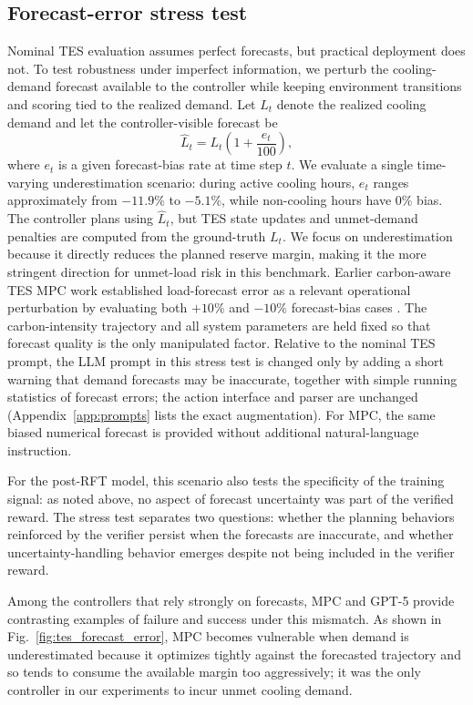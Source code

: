 \documentclass[11pt]{article}
\begin{document}
\subsection{Forecast-error stress test}\label{subsec:robustness}
Nominal TES evaluation assumes perfect forecasts, but practical deployment does not. To test robustness under imperfect information, we perturb the cooling-demand forecast available to the controller while keeping environment transitions and scoring tied to the realized demand. Let $L_t$ denote the realized cooling demand and let the controller-visible forecast be
\begin{equation}
\hat L_t=L_t\left(1+\frac{e_t}{100}\right),
\end{equation}
where $e_t$ is a given forecast-bias rate at time step $t$. We evaluate a single time-varying underestimation scenario: during active cooling hours, $e_t$ ranges approximately from $-11.9\%$ to $-5.1\%$, while non-cooling hours have $0\%$ bias. The controller plans using $\hat L_t$, but TES state updates and unmet-demand penalties are computed from the ground-truth $L_t$. We focus on underestimation because it directly reduces the planned reserve margin, making it the more stringent direction for unmet-load risk in this benchmark. Earlier carbon-aware TES MPC work established load-forecast error as a relevant operational perturbation by evaluating both $+10\%$ and $-10\%$ forecast-bias cases \cite{miyata2020_dynamic_co2_mpc}. The carbon-intensity trajectory and all system parameters are held fixed so that forecast quality is the only manipulated factor. Relative to the nominal TES prompt, the LLM prompt in this stress test is changed only by adding a short warning that demand forecasts may be inaccurate, together with simple running statistics of forecast errors; the action interface and parser are unchanged (Appendix~\ref{app:prompts} lists the exact augmentation). For MPC, the same biased numerical forecast is provided without additional natural-language instruction.

For the post-RFT model, this scenario also tests the specificity of the training signal: as noted above, no aspect of forecast uncertainty was part of the verified reward. The stress test separates two questions: whether the planning behaviors reinforced by the verifier persist when the forecasts are inaccurate, and whether uncertainty-handling behavior emerges despite not being included in the verifier reward.

Among the controllers that rely strongly on forecasts, MPC and GPT-5 provide contrasting examples of failure and success under this mismatch. As shown in Fig.~\ref{fig:tes_forecast_error}, MPC becomes vulnerable when demand is underestimated because it optimizes tightly against the forecasted trajectory and so tends to consume the available margin too aggressively; it was the only controller in our experiments to incur unmet cooling demand.
\end{document}
